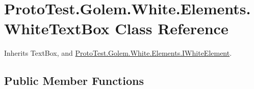 \hypertarget{class_proto_test_1_1_golem_1_1_white_1_1_elements_1_1_white_text_box}{\section{Proto\-Test.\-Golem.\-White.\-Elements.\-White\-Text\-Box Class Reference}
\label{class_proto_test_1_1_golem_1_1_white_1_1_elements_1_1_white_text_box}
}


Inherits Text\-Box, and \hyperlink{interface_proto_test_1_1_golem_1_1_white_1_1_elements_1_1_i_white_element}{Proto\-Test.\-Golem.\-White.\-Elements.\-I\-White\-Element}.

\subsection*{Public Member Functions}
